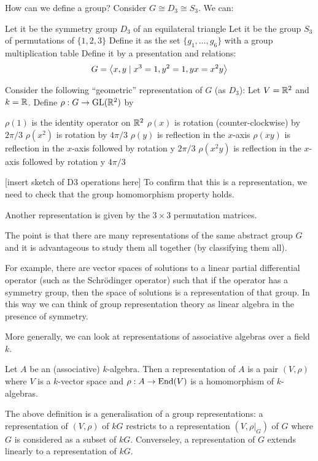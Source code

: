 \begin{exam}
	How can we define a group?
	Consider $G \cong D_3 \cong S_3$.
	We can:
	\begin{itm}
		\io Let it be the symmetry group $D_3$ of an equilateral triangle
		\io Let it be the group $S_3$ of permutations of $\{1,2,3\}$
		\io Define it as the set $\{g_1,\ldots,g_6\}$ with a group multiplication table
		\io Define it by a presentation and relations:
		\[G={\left\langle x,y \mid x^3=1, y^2=1, yx=x^2y \right\rangle}\]
	\end{itm}
	
	Consider the following ``geometric'' representation of $G$ (as $D_3$):
	Let $V=\mathbb{R}^2$ and $k=\mathbb{R}$.
	Define $\rho:G \to \operatorname{GL}(\mathbb{R}^2)$ by
	\begin{itm}
		\io $\rho(1)$ is the identity operator on $\mathbb{R}^2$
		\io $\rho(x)$ is rotation (counter-clockwise) by $2\pi/3$
		\io $\rho(x^2)$ is rotation by $4\pi/3$
		\io $\rho(y)$ is reflection in the $x$-axis
		\io $\rho(xy)$ is reflection in the $x$-axis followed by rotation y $2\pi/3$
		\io $\rho(x^2y)$ is reflection in the $x$-axis followed by rotation y $4\pi/3$
	\end{itm}
	[insert sketch of D3 operations here]
	To confirm that this is a representation, we need to check that the group homomorphism property holds.
	
	Another representation is given by the $3 \times 3$ permutation matrices.
	
	The point is that there are many representations of the same abstract group $G$ and it is advantageous to study them all together (by classifying them all).
	
	For example, there are vector spaces of solutions to a linear partial differential operator (such as the Schr\"odinger operator) such that if the operator has a symmetry group, then the space of solutions is a representation of that group.
	In this way we can think of group representation theory as linear algebra in the presence of symmetry.
\end{exam}

More generally, we can look at representations of associative algebras over a field $k$.

\begin{defn}
	Let $A$ be an (associative) $k$-algebra.
	Then a representation of $A$ is a pair $(V,\rho)$ where $V$ is a $k$-vector space and $\rho:A \to \operatorname{End}(V)$ is a homomorphism of $k$-algebras.
\end{defn}

\begin{rmk}
	The above definition is a generalisation of a group representations: a representation of $(V,\rho)$ of $kG$ restricts to a representation $(V,\rho|_G)$ of $G$ where $G$ is considered as a subset of $kG$.
	Converseley, a representation of $G$ extends linearly to a representation of $kG$.
\end{rmk}
